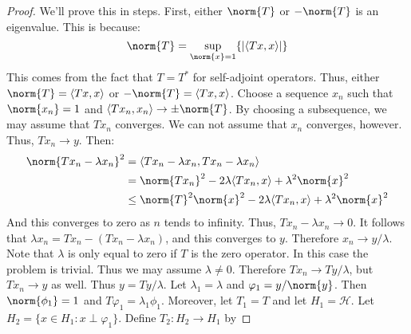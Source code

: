         \begin{proof}
            We'll prove this in steps. First, either
            $\norm{T}$ or $-\norm{T}$ is an eigenvalue. This
            is because:
            \begin{equation*}
                \norm{T}=
                \underset{\norm{x}=1}{\sup}
                \{|\langle{Tx,x}\rangle|\}
            \end{equation*}
            This comes from the fact that
            $T=T^{*}$ for self-adjoint operators. Thus,
            either
            $\norm{T}=\langle{Tx,x}\rangle$ or
            $-\norm{T}=\langle{Tx,x}\rangle$. Choose a
            sequence $x_{n}$ such that
            $\norm{x_{n}}=1$ and
            $\langle{Tx_{n},x_{n}}\rangle%
             \rightarrow\pm\norm{T}$. By choosing a
            subsequence, we may assume that
            $Tx_{n}$ converges. We can not assume that
            $x_{n}$ converges, however. Thus,
            $Tx_{n}\rightarrow{y}$. Then:
            \begin{align*}
                \norm{Tx_{n}-\lambda{x}_{n}}^{2}
                &=\langle{Tx_{n}-\lambda{x}_{n},
                          Tx_{n}-\lambda{x}_{n}}\rangle\\
                &=\norm{Tx_{n}}^{2}
                -2\lambda\langle{Tx_{n},x}\rangle
                +\lambda^{2}\norm{x}^{2}\\
                &\leq
                \norm{T}^{2}\norm{x}^{2}
                -2\lambda\langle{Tx_{n},x}\rangle
                +\lambda^{2}\norm{x}^{2}
            \end{align*}
            And this converges to zero as $n$ tends to
            infinity. Thus,
            $Tx_{n}-\lambda{x}_{n}\rightarrow{0}$. It
            follows that
            $\lambda{x}_{n}=Tx_{n}-(Tx_{n}-\lambda{x}_{n})$,
            and this converges to $y$. Therefore
            $x_{n}\rightarrow{y}/\lambda$. Note that
            $\lambda$ is only equal to zero if
            $T$ is the zero operator. In this case the
            problem is trivial. Thus we may assume
            $\lambda\ne{0}$. Therefore
            $Tx_{n}\rightarrow{Ty}/\lambda$, but
            $Tx_{n}\rightarrow{y}$ as well. Thus
            $y=Ty/\lambda$. Let $\lambda_{1}=\lambda$
            and $\varphi_{1}=y/\norm{y}$. Then
            $\norm{\phi_{1}}=1$ and
            $T\varphi_{1}=\lambda_{1}\phi_{1}$. Moreover,
            let $T_{1}=T$ and let $H_{1}=\mathscr{H}$.
            Let $H_{2}=\{x\in{H}_{1}:x\perp\varphi_{1}\}$.
            Define $T_{2}:H_{2}\rightarrow{H}_{1}$ by

\end{proof}
